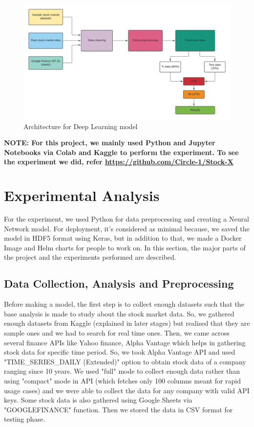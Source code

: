 \documentclass[conference]{IEEEtran}
\begin{document}
\begin{figure}[htbp]
\centerline{\includegraphics[scale=0.3]{SI - Arch.png}}
\caption{Architecture for Deep Learning model}
\label{model-sam}
\end{figure}

\textbf{NOTE: For this project, we mainly used Python and Jupyter Notebooks via Colab and Kaggle to perform the experiment. To see the experiment we did, refer \url{https://github.com/Circle-1/Stock-X}}

\section{Experimental Analysis}
For the experiment, we used Python for data preprocessing and creating a Neural Network model. For deployment, it's considered as minimal because, we saved the model in HDF5 format using Keras, but in addition to that, we made a Docker Image and Helm charts for people to work on. In this section, the major parts of the project and the experiments performed are described.

\subsection{Data Collection, Analysis and Preprocessing}\label{A}
Before making a model, the first step is to collect enough datasets such that the base analysis is made to study about the stock market data. So, we gathered enough datasets from Kaggle (explained in later stages) but realised that they are sample ones and we had to search for real time ones. Then, we came across several finance APIs like Yahoo finance, Alpha Vantage which helps in gathering stock data for specific time period. So, we took Alpha Vantage API and used "TIME\_SERIES\_DAILY (Extended)" option to obtain stock data of a company ranging since 10 years. We used "full" mode to collect enough data rather than using "compact" mode in API (which fetches only 100 columns meant for rapid usage cases) and we were able to collect the data for any company with valid API keys. Some stock data is also gathered using Google Sheets via "GOOGLEFINANCE" function. Then we stored the data in CSV format for testing phase.
\end{document}
